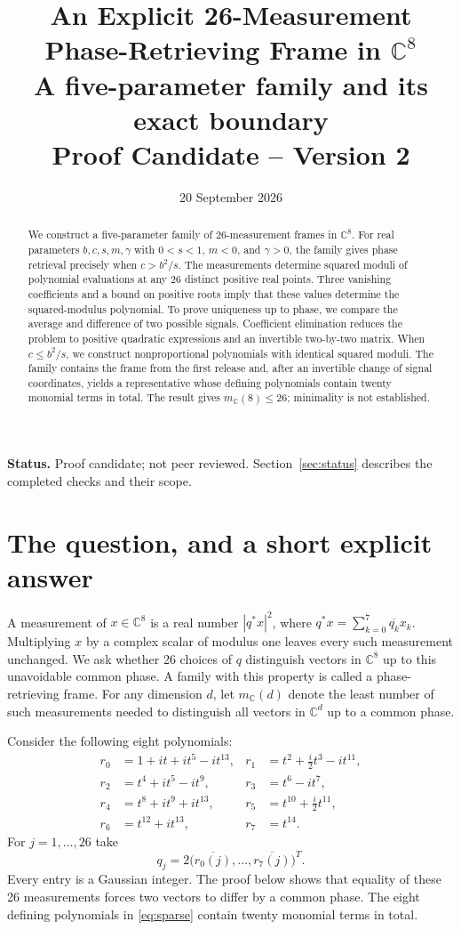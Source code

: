 \documentclass[11pt,a4paper]{article}
\title{An Explicit 26-Measurement\\Phase-Retrieving Frame in $\mathbb C^8$\\[0.5em]
\large A five-parameter family and its exact boundary\\Proof Candidate -- Version 2}
\date{20 September 2026}
\newcommand{\CC}{\mathbb C}
\begin{document}
\maketitle
\begin{abstract}
We construct a five-parameter family of 26-measurement frames in $\CC^8$.
For real parameters $b,c,s,m,\gamma$ with $0<s<1$, $m<0$, and $\gamma>0$,
the family gives phase retrieval precisely when $c>b^2/s$.
The measurements determine squared moduli of polynomial evaluations at any
26 distinct positive real points. Three vanishing coefficients and a bound
on positive roots imply that these values determine the squared-modulus
polynomial. To prove
uniqueness up to phase, we compare the average and difference of two
possible signals. Coefficient elimination reduces the problem to positive
quadratic expressions and an invertible two-by-two matrix. When $c\le b^2/s$,
we construct nonproportional polynomials with identical squared moduli.
The family contains the frame from the first release and, after an
invertible change of signal coordinates, yields a representative whose
defining polynomials contain twenty monomial terms in total. The result gives $m_{\CC}(8)\le26$;
minimality is not established.
\end{abstract}
\noindent\textbf{Status.} Proof candidate; not peer reviewed.
Section~\ref{sec:status} describes
the completed checks and their scope.

\section{The question, and a short explicit answer}
A measurement of $x\in\CC^8$ is a real number $|q^*x|^2$, where
$q^*x=\sum_{k=0}^7\overline{q_k}x_k$.
Multiplying $x$ by a complex scalar of modulus one leaves every such
measurement unchanged. We ask whether 26 choices of $q$ distinguish
vectors in $\CC^8$ up to this unavoidable common phase.
A family with this property is called a phase-retrieving frame.
For any dimension $d$, let $m_{\CC}(d)$ denote the least number of such
measurements needed to distinguish all vectors in $\CC^d$ up to a common phase.

Consider the following eight polynomials:
\begin{equation}\label{eq:sparse}
\begin{aligned}
r_0&=1+it+it^5-it^{13},&
r_1&=t^2+\tfrac i2t^3-it^{11},\\
r_2&=t^4+it^5-it^9,&
r_3&=t^6-it^7,\\
r_4&=t^8+it^9+it^{13},&
r_5&=t^{10}+\tfrac i2t^{11},\\
r_6&=t^{12}+it^{13},&r_7&=t^{14}.
\end{aligned}
\end{equation}
For $j=1,\ldots,26$ take
\begin{equation}\label{eq:sparseframe}
 q_j=2\bigl(\overline{r_0(j)},\ldots,\overline{r_7(j)}\bigr)^T.
\end{equation}
Every entry is a Gaussian integer. The proof below shows that equality of
these 26 measurements forces two vectors to differ by a common phase.
The eight defining polynomials in \eqref{eq:sparse} contain twenty monomial
terms in total.
\end{document}
